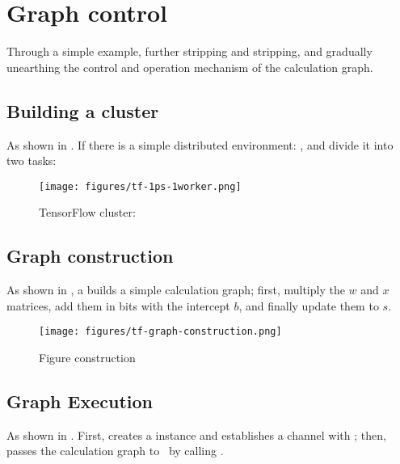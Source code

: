 \section{Graph control}
\begin{content}
Through a simple example, further stripping and stripping, and gradually unearthing the control and operation mechanism of the \tf{} calculation graph.


\subsection{Building a cluster}
As shown in . If there is a simple distributed environment: , and divide it into two tasks:

\begin{enum}
\end{enum}

\begin{figure}[!htbp]
  \centering
  \texttt{[image: figures/tf-1ps-1worker.png]}
  \caption{TensorFlow cluster: }
  \label{fig:tf-1ps-1worker}
\end{figure}


\subsection{Graph construction}
As shown in , a  builds a simple calculation graph; first, multiply the $w$ and $x$ matrices, add them in bits with the intercept $b$, and finally update them to $s$.

\begin{figure}[!htbp]
  \centering
  \texttt{[image: figures/tf-graph-construction.png]}
  \caption{Figure construction}
  \label{fig:tf-graph-construction}
\end{figure}

\subsection{Graph Execution}
As shown in . First,  creates a  instance and establishes a channel with ; then,  passes the calculation graph to \ by calling  .


\end{content}
